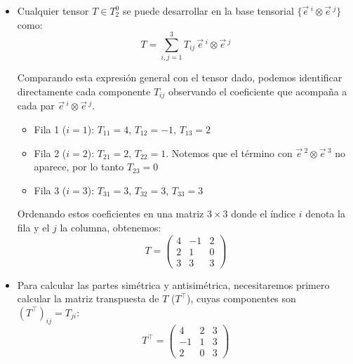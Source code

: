 \documentclass[11pt,spanish]{article}
\newcommand{\svec}[1]{\vec{#1}{\,}\mbox{}}
\begin{document}
\begin{itemize}
\item[a)]
Cualquier tensor $T \in T_2^0$ se puede desarrollar en la base tensorial $\{\svec{e}^i \otimes \svec{e}^j\}$ como:
$$T = \sum_{i,j=1}^3 T_{ij} \, \svec{e}^i \otimes \svec{e}^j$$

Comparando esta expresión general con el tensor dado, podemos identificar directamente cada componente $T_{ij}$ observando el coeficiente que acompaña a cada par $\svec{e}^i \otimes \svec{e}^j$.
\begin{itemize}
\item Fila 1 ($i=1$): $T_{11} = 4$, $T_{12} = -1$, $T_{13} = 2$
\item Fila 2 ($i=2$): $T_{21} = 2$, $T_{22} = 1$. Notemos que el término con $\svec{e}^2 \otimes \svec{e}^3$ no aparece, por lo tanto $T_{23} = 0$
\item Fila 3 ($i=3$): $T_{31} = 3$, $T_{32} = 3$, $T_{33} = 3$
\end{itemize}

Ordenando estos coeficientes en una matriz $3\times3$ donde el índice $i$ denota la fila y el $j$ la columna, obtenemos:
$$
T = \begin{pmatrix}
4 & -1 & 2 \\
2 & 1 & 0 \\
3 & 3 & 3
\end{pmatrix}
$$

\item[b)]
Para calcular las partes simétrica y antisimétrica, necesitaremos primero calcular la matriz transpuesta de $T$ ($T^\top$), cuyas componentes son $(T^\top)_{ij} = T_{ji}$:
$$
T^\top = \begin{pmatrix}
4 & 2 & 3 \\
-1 & 1 & 3 \\
2 & 0 & 3
\end{pmatrix}
$$


\end{itemize}
\end{document}
